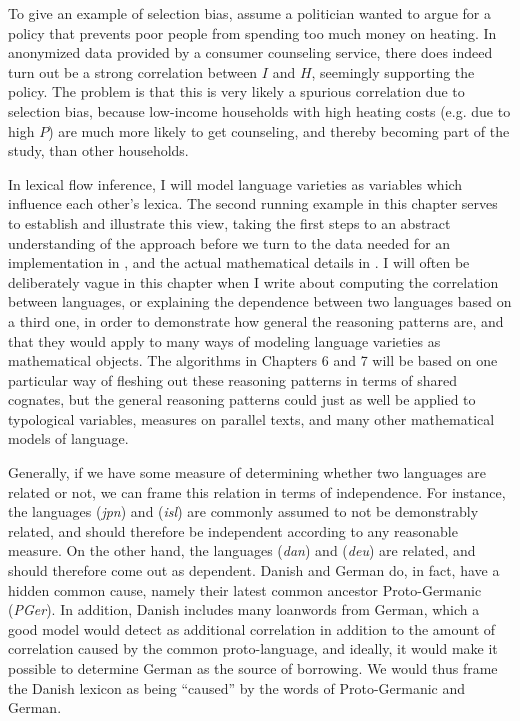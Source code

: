 To give an example of selection bias, assume a politician wanted to argue for a policy that prevents poor people from spending too much money on heating. In anonymized data provided by a consumer counseling service, there does indeed turn out be a strong correlation between $I$ and $H$, seemingly supporting the policy. The problem is that this is very likely a spurious correlation due to selection bias, because low-income households with high heating costs (e.g. due to high $P$) are much more likely to get counseling, and thereby becoming part of the study, than other households.

In lexical flow inference, I will model language varieties as variables which influence each other's lexica. The second running example in this chapter serves to establish and illustrate this view, taking the first steps to an abstract understanding of the approach before we turn to the data needed for an implementation in , and the actual mathematical details in . I will often be deliberately vague in this chapter when I write about computing the correlation between languages, or explaining the dependence between two languages based on a third one, in order to demonstrate how general the reasoning patterns are, and that they would apply to many ways of modeling language varieties as mathematical objects. The algorithms in Chapters 6 and 7 will be based on one particular way of fleshing out these reasoning patterns in terms of shared cognates, but the general reasoning patterns could just as well be applied to typological variables, measures on parallel texts, and many other mathematical 
models of language.

\largerpage
Generally, if we have some measure of determining whether two languages are related or not, we can frame this relation in terms of independence. For instance, the languages  (\textit{jpn}) and  (\textit{isl}) are commonly assumed to not be demonstrably related, and should therefore be independent according to any reasonable measure. On the other hand, the languages  (\textit{dan}) and  (\textit{deu}) are related, and should therefore come out as dependent. Danish and German do, in fact, have a hidden common cause, namely their latest common ancestor Proto-Germanic (\textit{PGer}). In addition, Danish includes many loanwords from German, which a good model would detect as additional correlation in addition to the amount of correlation caused by the common proto-language, and ideally, it would make it possible to determine German as the source of borrowing. We would thus frame the Danish lexicon as being ``caused'' by the words of Proto-Germanic and German.

